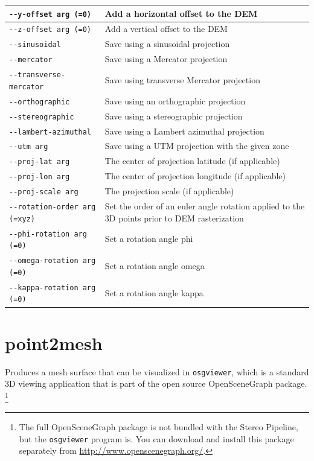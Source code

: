 \begin{longtable}{|l|p{10cm}|}
\verb#--y-offset arg (=0)# & Add a horizontal offset to the DEM \\ \hline
\verb#--z-offset arg (=0)# & Add a vertical offset to the DEM \\ \hline
\verb#--sinusoidal# & Save using a sinusoidal projection \\ \hline
\verb#--mercator# & Save using a Mercator projection \\ \hline
\verb#--transverse-mercator# & Save using transverse Mercator projection \\ \hline
\verb#--orthographic# & Save using an orthographic projection \\ \hline
\verb#--stereographic# & Save using a stereographic projection \\ \hline
\verb#--lambert-azimuthal# & Save using a Lambert azimuthal projection \\ \hline
\verb#--utm arg# & Save using a UTM projection with the given zone \\ \hline
\verb#--proj-lat arg# & The center of projection latitude (if applicable) \\ \hline
\verb#--proj-lon arg# & The center of projection longitude (if applicable) \\ \hline
\verb#--proj-scale arg# & The projection scale (if applicable) \\ \hline
\verb#--rotation-order arg (=xyz)# & Set the order of an euler angle rotation applied to the 3D points prior to DEM rasterization \\ \hline
\verb#--phi-rotation arg (=0)# & Set a rotation angle phi \\ \hline
\verb#--omega-rotation arg (=0)# & Set a rotation angle omega \\ \hline
\verb#--kappa-rotation arg (=0)# & Set a rotation angle kappa \\ \hline
\end{longtable}

\section{point2mesh}
\label{point2mesh}

Produces a mesh surface that can be visualized in {\tt osgviewer},
which is a standard 3D viewing application that is part of the open
source OpenSceneGraph package.  \footnote{The full OpenSceneGraph package
is not bundled with the Stereo Pipeline, but the \texttt{osgviewer} program
is.  You can download and install this package separately from 
\url{http://www.openscenegraph.org/}.}

